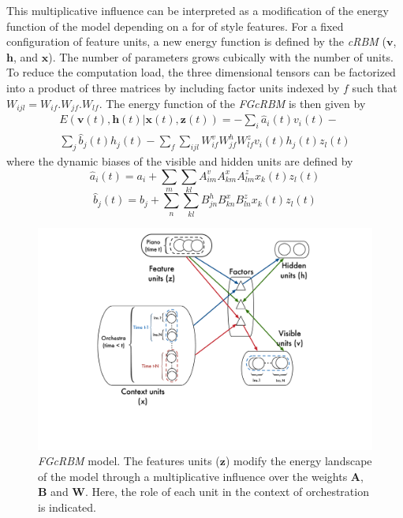 \documentclass[letterpaper]{article}
\begin{document}
This multiplicative influence can be interpreted as a modification of the energy function of the model depending on a for of style features. For a fixed configuration of feature units, a new energy function is defined by the \textit{cRBM} ($\bm{v}$, $\bm{h}$, and $\bm{x}$). The number of parameters grows cubically with the number of units. To reduce the computation load, the three dimensional tensors can be factorized into a product of three matrices by including factor units indexed by $f$ such that $W_{ijl} = W_{if} . W_{jf} . W_{lf}$.
The energy function of the \textit{FGcRBM} is then given by
\begin{equation}
\begin{split}
E(\bm{v}(t),\bm{h}(t)|\bm{x}(t),\bm{z}(t)) = - \sum_{i} \hat{a}_{i}(t)v_{i}(t) - \\ \sum_{j} \hat{b}_{j}(t)h_{j}(t)
-\sum_{f}\sum_{ijl} W_{if}^{v} W_{jf}^{h} W_{lf}^{z} v_{i}(t) h_{j}(t) z_{l}(t) 
\end{split}
\end{equation}
where the dynamic biases of the visible and hidden units are defined by
\begin{equation}
\hat{a}_{i}(t) = a_{i} + \sum_{m} \sum_{kl}A_{im}^{v}A_{km}^{x}A_{lm}^{z}x_{k}(t)z_{l}(t)
\end{equation}
\begin{equation}
\hat{b}_{j}(t) = b_{j} + \sum_{n} \sum_{kl}B_{jn}^{h}B_{kn}^{x}B_{ln}^{z}x_{k}(t)z_{l}(t)
\end{equation}

\begin{figure}[ht]
\centering
\includegraphics[scale=0.20]{FGcRBM_orchestration}
\caption{\textit{FGcRBM} model. The features units ($\bm{z}$) modify the energy landscape of the model through a multiplicative influence over the weights $\bm{A}$, $\bm{B}$ and $\bm{W}$. Here, the role of each unit in the context of orchestration is indicated.}
\label{fig:FGcRBM}
\end{figure}
\end{document}
